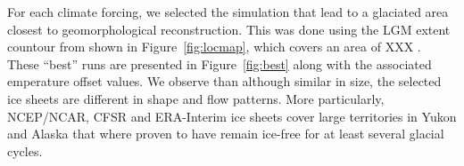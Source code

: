 For each climate forcing, we selected the simulation that lead to a glaciated area closest to geomorphological reconstruction. This was done using the LGM extent countour from \needref shown in Figure~\ref{fig:locmap}, which covers an area of XXX . These ``best'' runs are presented in Figure~\ref{fig:best} along with the associated emperature offset values. We observe than although similar in size, the selected ice sheets are different in shape and flow patterns. More particularly, NCEP/NCAR, CFSR and ERA-Interim ice sheets cover large territories in Yukon and Alaska that where proven to have remain ice-free for at least several glacial cycles.\needref

